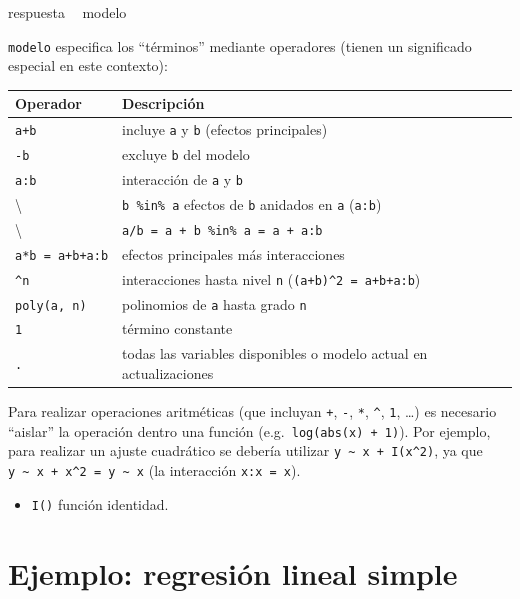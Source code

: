 \documentclass[]{book}
\newenvironment{Shaded}{\begin{snugshade}}{\end{snugshade}}
\newcommand{\NormalTok}[1]{#1}
\newcommand{\OperatorTok}[1]{\textcolor[rgb]{0.81,0.36,0.00}{\textbf{#1}}}
\newcommand{\StringTok}[1]{\textcolor[rgb]{0.31,0.60,0.02}{#1}}
\providecommand{\tightlist}{%
  \setlength{\itemsep}{0pt}\setlength{\parskip}{0pt}}
\begin{document}
\begin{Shaded}
\begin{Highlighting}[]
\NormalTok{respuesta }\OperatorTok{~}\StringTok{ }\NormalTok{modelo}
\end{Highlighting}
\end{Shaded}

\texttt{modelo} especifica los ``términos'' mediante operadores (tienen un significado especial en este contexto):

\begin{longtable}[]{@{}ll@{}}
\toprule
Operador & Descripción\tabularnewline
\midrule
\endhead
\texttt{a+b} & incluye \texttt{a} y \texttt{b} (efectos principales)\tabularnewline
\texttt{-b} & excluye \texttt{b} del modelo\tabularnewline
\texttt{a:b} & interacción de \texttt{a} y \texttt{b}\tabularnewline
\textbackslash{} & \texttt{b\ \%in\%\ a} efectos de \texttt{b} anidados en \texttt{a} (\texttt{a:b})\tabularnewline
\textbackslash{} & \texttt{a/b\ =\ a\ +\ b\ \%in\%\ a\ =\ a\ +\ a:b}\tabularnewline
\texttt{a*b\ =\ a+b+a:b} & efectos principales más interacciones\tabularnewline
\texttt{\^{}n} & interacciones hasta nivel \texttt{n} (\texttt{(a+b)\^{}2\ =\ a+b+a:b})\tabularnewline
\texttt{poly(a,\ n)} & polinomios de \texttt{a} hasta grado \texttt{n}\tabularnewline
\texttt{1} & término constante\tabularnewline
\texttt{.} & todas las variables disponibles o modelo actual en actualizaciones\tabularnewline
\bottomrule
\end{longtable}

Para realizar operaciones aritméticas (que incluyan \texttt{+}, \texttt{-}, \texttt{*}, \texttt{\^{}}, \texttt{1}, \ldots{})
es necesario ``aislar'' la operación
dentro una función (e.g.~\texttt{log(abs(x)\ +\ 1)}).
Por ejemplo, para realizar un ajuste cuadrático se debería utilizar \texttt{y\ \textasciitilde{}\ x\ +\ I(x\^{}2)}, ya que \texttt{y\ \textasciitilde{}\ x\ +\ x\^{}2\ =\ y\ \textasciitilde{}\ x} (la interacción \texttt{x:x\ =\ x}).

\begin{itemize}
\tightlist
\item
  \texttt{I()} función identidad.
\end{itemize}

\hypertarget{ejemplo-regresion-lineal-simple}{%
\section{Ejemplo: regresión lineal simple}\label{ejemplo-regresion-lineal-simple}}
\end{document}
